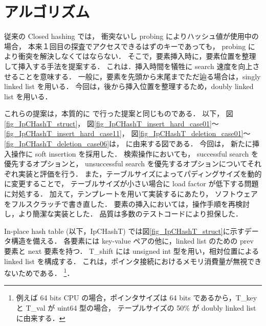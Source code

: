 \chapter{アルゴリズム}
\label{chap_Algorism}

従来の Closed hashing では，
衝突ないし probing によりハッシュ値が使用中の場合，
本来１回目の探査でアクセスできるはずのキーであっても，
probing により衝突を解決しなくてはならない．
そこで，要素挿入時に，要素位置を整理して挿入する手法を提案する．
これは．挿入時間を犠牲に search 速度を向上させることを意味する．
一般に，要素を先頭から末尾までただ辿る場合は，singly linked list を用いる．
今回は，後から挿入位置を整理するため，doubly linked list を用いる．

これらの提案は，本質的に \cite{ADMIS2017} で行った提案と同じものである．
以下，
図\ref{fig_IpCHashT_struct}，
図\ref{fig_IpCHashT_insert_hard_case01}〜\ref{fig_IpCHashT_insert_hard_case11}，
図\ref{fig_IpCHashT_deletion_case01}〜\ref{fig_IpCHashT_deletion_case06}は，
\cite{ADMIS2017} に由来する図である．
今回は，
新たに挿入操作に soft insertion を採用した．
検索操作においても，
successful search を優先するオプションと，
unsuccessful search を優先するオプションについてそれぞれ実装と評価を行う．
また，テーブルサイズによってパディングサイズを動的に変更することで，
テーブルサイズが小さい場合に load factor が低下する問題に対処する．
加えて，テンプレートを用いて実装するにあたり，
ソフトウェアをフルスクラッチで書き直した．
要素の挿入においては，操作手順を再検討し，より簡潔な実装とした．
品質は多数のテストコードにより担保した．

In-place hash table (以下，IpCHashT) では図\ref{fig_IpCHashT_struct}に示すデータ構造を備える．
各要素には key-value ペアの他に，linked list のための prev 要素と next 要素を持つ．
T\_shift には unsigned int 型を用い，相対位置による linked list を構成する．
これは，ポインタ接続におけるメモリ消費量が無視できないためである．
\footnote{
  例えば 64 bits CPU の場合，ポインタサイズは 64 bits であるから，T\_key と T\_val が uint64 型の場合，
  テープルサイズの 50\% が doubly linked list に由来する．
}．

